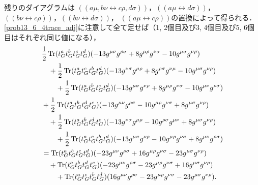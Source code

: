 残りのダイアグラムは
$(\!(a\mu, b\nu\leftrightarrow c\rho, d\sigma)\!)$，$(\!(a\mu\leftrightarrow d\sigma)\!)$，
$(\!(b\nu\leftrightarrow c\rho)\!)$，$(\!(b\nu\leftrightarrow d\sigma)\!)$，
$(\!(a\mu\leftrightarrow c\rho)\!)$の置換によって得られる．
\eqref{prob13_6_4trace_adj}に注意して全て足せば（1, 2個目及び3, 4個目及び5, 6個目はそれぞれ同じ値になる），
\begin{align*}
  & \frac{1}{2} \operatorname{Tr}(t_G^a t_G^b t_G^c t_G^d) (-13 g^{\mu\nu} g^{\rho\sigma} + 8g^{\mu\rho} g^{\nu\sigma} - 10 g^{\mu\sigma} g^{\nu\rho}) \\
  &\quad + \frac{1}{2} \operatorname{Tr}(t_G^a t_G^c t_G^b t_G^d) (-13 g^{\nu\sigma} g^{\mu\rho} + 8g^{\rho\sigma} g^{\nu\mu} - 10 g^{\mu\sigma} g^{\nu\rho}) \\
  &\qquad + \frac{1}{2} \operatorname{Tr}(t_G^a t_G^b t_G^c t_G^d) (-13 g^{\mu\sigma} g^{\nu\rho} + 8g^{\mu\rho} g^{\nu\sigma} - 10 g^{\mu\nu} g^{\rho\sigma}) \\
  & + \frac{1}{2} \operatorname{Tr}(t_G^a t_G^b t_G^d t_G^c) (-13 g^{\mu\nu} g^{\rho\sigma} - 10 g^{\mu\rho} g^{\nu\sigma} + 8g^{\mu\sigma} g^{\nu\rho}) \\
  &\quad + \frac{1}{2} \operatorname{Tr}(t_G^a t_G^b t_G^d t_G^c) (-13 g^{\nu\sigma} g^{\mu\rho} - 10 g^{\rho\sigma} g^{\mu\nu} + 8g^{\mu\sigma} g^{\nu\rho}) \\
  &\qquad + \frac{1}{2} \operatorname{Tr}(t_G^a t_G^c t_G^b t_G^d) (-13 g^{\mu\sigma} g^{\nu\rho} - 10 g^{\mu\rho} g^{\nu\sigma} + 8g^{\mu\nu} g^{\rho\sigma}) \\
  &= \operatorname{Tr}(t_G^a t_G^b t_G^c t_G^d) (-23 g^{\mu\nu} g^{\rho\sigma} + 16 g^{\mu\rho} g^{\nu\sigma} - 23 g^{\mu\sigma} g^{\nu\rho}) \\
  &\quad + \operatorname{Tr}(t_G^a t_G^b t_G^d t_G^c) (- 23 g^{\mu\nu} g^{\rho\sigma} - 23 g^{\mu\rho} g^{\nu\sigma} + 16 g^{\mu\sigma} g^{\nu\rho}) \\
  &\qquad + \operatorname{Tr}(t_G^a t_G^c t_G^b t_G^d) (16 g^{\mu\nu} g^{\rho\sigma} - 23 g^{\mu\rho} g^{\nu\sigma} - 23 g^{\mu\sigma} g^{\nu\rho}) .
\end{align*}

